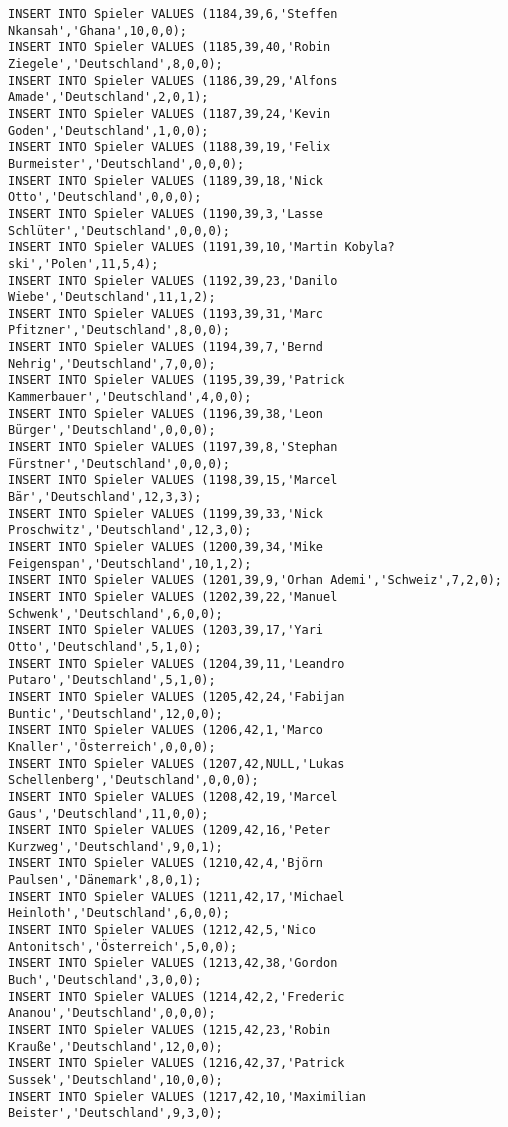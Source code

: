 \documentclass{lehramt-informatik-aufgabe}
\begin{document}
\begin{verbatim}
INSERT INTO Spieler VALUES (1184,39,6,'Steffen Nkansah','Ghana',10,0,0);
INSERT INTO Spieler VALUES (1185,39,40,'Robin Ziegele','Deutschland',8,0,0);
INSERT INTO Spieler VALUES (1186,39,29,'Alfons Amade','Deutschland',2,0,1);
INSERT INTO Spieler VALUES (1187,39,24,'Kevin Goden','Deutschland',1,0,0);
INSERT INTO Spieler VALUES (1188,39,19,'Felix Burmeister','Deutschland',0,0,0);
INSERT INTO Spieler VALUES (1189,39,18,'Nick Otto','Deutschland',0,0,0);
INSERT INTO Spieler VALUES (1190,39,3,'Lasse Schlüter','Deutschland',0,0,0);
INSERT INTO Spieler VALUES (1191,39,10,'Martin Kobyla?ski','Polen',11,5,4);
INSERT INTO Spieler VALUES (1192,39,23,'Danilo Wiebe','Deutschland',11,1,2);
INSERT INTO Spieler VALUES (1193,39,31,'Marc Pfitzner','Deutschland',8,0,0);
INSERT INTO Spieler VALUES (1194,39,7,'Bernd Nehrig','Deutschland',7,0,0);
INSERT INTO Spieler VALUES (1195,39,39,'Patrick Kammerbauer','Deutschland',4,0,0);
INSERT INTO Spieler VALUES (1196,39,38,'Leon Bürger','Deutschland',0,0,0);
INSERT INTO Spieler VALUES (1197,39,8,'Stephan Fürstner','Deutschland',0,0,0);
INSERT INTO Spieler VALUES (1198,39,15,'Marcel Bär','Deutschland',12,3,3);
INSERT INTO Spieler VALUES (1199,39,33,'Nick Proschwitz','Deutschland',12,3,0);
INSERT INTO Spieler VALUES (1200,39,34,'Mike Feigenspan','Deutschland',10,1,2);
INSERT INTO Spieler VALUES (1201,39,9,'Orhan Ademi','Schweiz',7,2,0);
INSERT INTO Spieler VALUES (1202,39,22,'Manuel Schwenk','Deutschland',6,0,0);
INSERT INTO Spieler VALUES (1203,39,17,'Yari Otto','Deutschland',5,1,0);
INSERT INTO Spieler VALUES (1204,39,11,'Leandro Putaro','Deutschland',5,1,0);
INSERT INTO Spieler VALUES (1205,42,24,'Fabijan Buntic','Deutschland',12,0,0);
INSERT INTO Spieler VALUES (1206,42,1,'Marco Knaller','Österreich',0,0,0);
INSERT INTO Spieler VALUES (1207,42,NULL,'Lukas Schellenberg','Deutschland',0,0,0);
INSERT INTO Spieler VALUES (1208,42,19,'Marcel Gaus','Deutschland',11,0,0);
INSERT INTO Spieler VALUES (1209,42,16,'Peter Kurzweg','Deutschland',9,0,1);
INSERT INTO Spieler VALUES (1210,42,4,'Björn Paulsen','Dänemark',8,0,1);
INSERT INTO Spieler VALUES (1211,42,17,'Michael Heinloth','Deutschland',6,0,0);
INSERT INTO Spieler VALUES (1212,42,5,'Nico Antonitsch','Österreich',5,0,0);
INSERT INTO Spieler VALUES (1213,42,38,'Gordon Buch','Deutschland',3,0,0);
INSERT INTO Spieler VALUES (1214,42,2,'Frederic Ananou','Deutschland',0,0,0);
INSERT INTO Spieler VALUES (1215,42,23,'Robin Krauße','Deutschland',12,0,0);
INSERT INTO Spieler VALUES (1216,42,37,'Patrick Sussek','Deutschland',10,0,0);
INSERT INTO Spieler VALUES (1217,42,10,'Maximilian Beister','Deutschland',9,3,0);

\end{verbatim}
\end{document}
